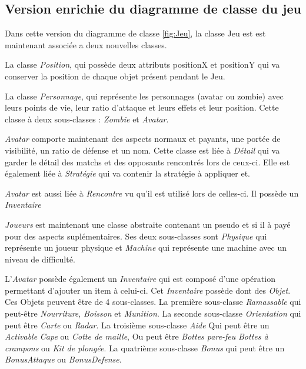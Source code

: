 
\subsection{Version enrichie du diagramme de classe du jeu}
\label{sec:question-2}

Dans cette version du diagramme de classe \ref{fig:Jeu}, la classe Jeu est est maintenant associée a deux nouvelles classes.

La classe \emph{Position}, qui possède deux attributs positionX et positionY qui va conserver la position de chaque objet présent pendant le Jeu.

La classe \emph{Personnage}, qui représente les personnages (avatar ou zombie) avec leurs points de vie, leur ratio d'attaque et leurs effets et leur position. Cette classe à deux sous-classes :
\emph{Zombie} et \emph{Avatar}.

\emph{Avatar} comporte maintenant des aspects normaux et payants, une portée de visibilité, un ratio de défense et un nom. Cette classe est liée à \emph{Détail} qui va garder le détail des matchs et des
opposants rencontrés lors de ceux-ci. Elle est également liée à \emph{Stratégie} qui va contenir la stratégie à appliquer et.

\emph{Avatar} est aussi liée à \emph{Rencontre} vu qu'il est utilisé lors de celles-ci. Il possède un \emph{Inventaire}

\emph{Joueurs} est maintenant une classe abstraite contenant un pseudo et si il à payé pour des aspects suplémentaires. Ses deux sous-classes sont \emph{Physique} qui représente un joueur physique et 
\emph{Machine} qui représente une machine avec un niveau de difficulté.

L'\emph{Avatar} possède également un \emph{Inventaire} qui est composé d'une opération permettant d'ajouter un item à celui-ci. Cet \emph{Inventaire} possède dont des \emph{Objet}. Ces Objets peuvent être de 4
sous-classes. La première sous-classe \emph{Ramassable} qui peut-être \emph{Nourriture}, \emph{Boisson} et \emph{Munition}. La seconde sous-classe \emph{Orientation} qui peut être \emph{Carte} ou \emph{Radar}.
La troisième sous-classe \emph{Aide} Qui peut être un \emph{Activable} \emph{Cape} ou \emph{Cotte de maille}, Ou peut être \emph{Bottes pare-feu} \emph{Bottes à crampons} ou \emph{Kit de plongée}. La quatrième
sous-classe \emph{Bonus} qui peut être un \emph{BonusAttaque} ou \emph{BonusDefense}.

